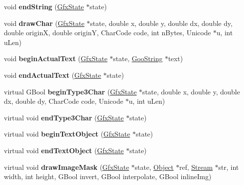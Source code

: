 \begin{DoxyCompactItemize}
void {\bfseries end\+String} (\hyperlink{class_gfx_state}{Gfx\+State} $\ast$state)
\item 
\mbox{\label{class_cairo_output_dev_ac80b026267cb960974ad8313cf0c39e8}} 
void {\bfseries draw\+Char} (\hyperlink{class_gfx_state}{Gfx\+State} $\ast$state, double x, double y, double dx, double dy, double originX, double originY, Char\+Code code, int n\+Bytes, Unicode $\ast$u, int u\+Len)
\item 
\mbox{\label{class_cairo_output_dev_a9225963a487986859a08e1c64e6a7ee5}} 
void {\bfseries begin\+Actual\+Text} (\hyperlink{class_gfx_state}{Gfx\+State} $\ast$state, \hyperlink{class_goo_string}{Goo\+String} $\ast$text)
\item 
\mbox{\label{class_cairo_output_dev_a514fee07e07b59214bdede06c892207d}} 
void {\bfseries end\+Actual\+Text} (\hyperlink{class_gfx_state}{Gfx\+State} $\ast$state)
\item 
\mbox{\label{class_cairo_output_dev_a6270a30f574db6e3ed81bfcb8222e9d5}} 
virtual G\+Bool {\bfseries begin\+Type3\+Char} (\hyperlink{class_gfx_state}{Gfx\+State} $\ast$state, double x, double y, double dx, double dy, Char\+Code code, Unicode $\ast$u, int u\+Len)
\item 
\mbox{\label{class_cairo_output_dev_a8e9762c7f5577a5f41457b7c8f056b32}} 
virtual void {\bfseries end\+Type3\+Char} (\hyperlink{class_gfx_state}{Gfx\+State} $\ast$state)
\item 
\mbox{\label{class_cairo_output_dev_a78130c8541dbae7a8867d2913877a2eb}} 
virtual void {\bfseries begin\+Text\+Object} (\hyperlink{class_gfx_state}{Gfx\+State} $\ast$state)
\item 
\mbox{\label{class_cairo_output_dev_a5c01138592f810f24648777d0a79223d}} 
virtual void {\bfseries end\+Text\+Object} (\hyperlink{class_gfx_state}{Gfx\+State} $\ast$state)
\item 
\mbox{\label{class_cairo_output_dev_a840e6b7405351d4406897e68c03b7bc3}} 
virtual void {\bfseries draw\+Image\+Mask} (\hyperlink{class_gfx_state}{Gfx\+State} $\ast$state, \hyperlink{class_object}{Object} $\ast$ref, \hyperlink{class_stream}{Stream} $\ast$str, int width, int height, G\+Bool invert, G\+Bool interpolate, G\+Bool inline\+Img)

\end{DoxyCompactItemize}
